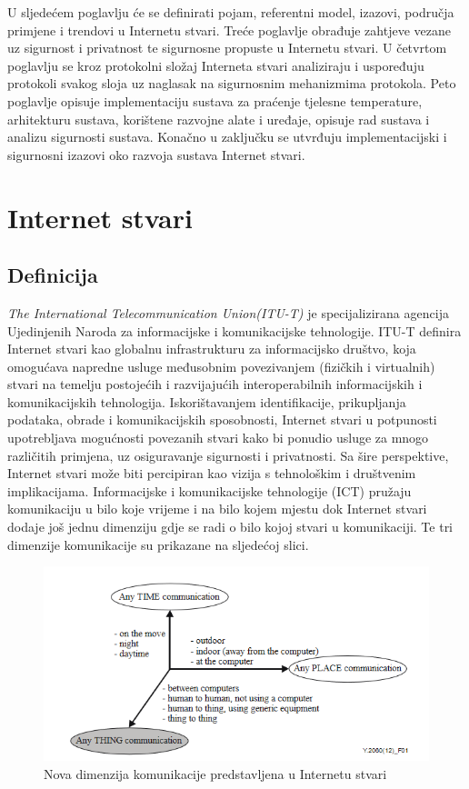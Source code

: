 \documentclass[times, utf8, diplomski]{fer}
\begin{document}
U sljedećem poglavlju će se definirati pojam, referentni model, izazovi, područja primjene i trendovi u Internetu stvari. Treće poglavlje obrađuje zahtjeve vezane uz sigurnost i privatnost te sigurnosne propuste u Internetu stvari. U četvrtom poglavlju se kroz protokolni složaj Interneta stvari analiziraju i uspoređuju protokoli svakog sloja uz naglasak na sigurnosnim mehanizmima protokola. Peto poglavlje opisuje implementaciju sustava za praćenje tjelesne temperature, arhitekturu sustava, korištene razvojne alate i uređaje, opisuje rad sustava i analizu sigurnosti sustava. Konačno u zaključku se utvrđuju implementacijski i sigurnosni izazovi oko razvoja sustava Internet stvari.

\chapter{Internet stvari}

\section{Definicija}
\emph{The International Telecommunication Union(ITU-T)} je specijalizirana agencija Ujedinjenih Naroda za informacijske i komunikacijske tehnologije. ITU-T definira Internet stvari kao globalnu infrastrukturu za informacijsko društvo, koja omogućava napredne usluge međusobnim povezivanjem (fizičkih i virtualnih) stvari na temelju postojećih i razvijajućih interoperabilnih informacijskih i komunikacijskih tehnologija. Iskorištavanjem identifikacije, prikupljanja podataka, obrade i komunikacijskih sposobnosti, Internet stvari u potpunosti upotrebljava mogućnosti povezanih stvari kako bi ponudio usluge za mnogo različitih primjena, uz osiguravanje sigurnosti i privatnosti. Sa šire perspektive, Internet stvari može biti percipiran kao vizija s tehnološkim i društvenim implikacijama\citep{ITU-T/IoT}. Informacijske i komunikacijske tehnologije (ICT) pružaju komunikaciju u bilo koje vrijeme i na bilo kojem mjestu dok Internet stvari dodaje još jednu dimenziju gdje se radi o bilo kojoj stvari u komunikaciji. Te tri dimenzije komunikacije su prikazane na sljedećoj slici.
\begin{figure}[htb]
    \centering
    \includegraphics[width=14cm]{images/3dimenzije.png}
    \caption{Nova dimenzija komunikacije predstavljena u Internetu stvari\citep{ITU-T/IoT}}
    \label{fig:3-dim}
\end{figure}
\end{document}
